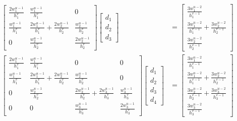 \documentclass{article}
\begin{document}
\begin{align*}
  \begin{bmatrix}
    \frac{2w_1^{u-1}}{h_1^v} & \frac{w_1^{u-1}}{h_1^v} & 0 \\
    \frac{w_1^{u-1}}{h_1^v} & \frac{2w_1^{u-1}}{h_1^v}+\frac{2w_2^{u-1}}{h_2^v} & \frac{w_2^{u-1}}{h_2^v} \\
    0 & \frac{w_2^{u-1}}{h_2^v} & \frac{2w_2^{u-1}}{h_2^v}
  \end{bmatrix}
  \begin{bmatrix}
    d_1 \\ d_2 \\ d_3
  \end{bmatrix}
  &= 
  \begin{bmatrix}
    \frac{3w_1^{u-2}}{h_1^{v-1}} \\
    \frac{3w_1^{u-2}}{h_1^{v-1}}+\frac{3w_2^{u-2}}{h_2^{v-1}} \\
    \frac{3w_2^{u-2}}{h_2^{v-1}}
  \end{bmatrix} \\
  \begin{bmatrix}
    \frac{2w_1^{u-1}}{h_1^v} & \frac{w_1^{u-1}}{h_1^v} & 0 & 0\\
    \frac{w_1^{u-1}}{h_1^v} & \frac{2w_1^{u-1}}{h_1^v}+\frac{2w_2^{u-1}}{h_2^v} & \frac{w_2^{u-1}}{h_2^v} & 0 \\
    0 & \frac{w_2^{u-1}}{h_2^v} & \frac{2w_2^{u-1}}{h_2^v}+\frac{2w_3^{u-1}}{h_3^v} & \frac{w_3^{u-1}}{h_3^v} \\
    0 & 0 & \frac{w_3^{u-1}}{h_3^v} & \frac{2w_3^{u-1}}{h_3^v}
  \end{bmatrix}
  \begin{bmatrix}
    d_1 \\ d_2 \\ d_3 \\ d_4
  \end{bmatrix}
  &= 
  \begin{bmatrix}
    \frac{3w_1^{u-2}}{h_1^{v-1}} \\
    \frac{3w_1^{u-2}}{h_1^{v-1}}+\frac{3w_2^{u-2}}{h_2^{v-1}} \\
    \frac{3w_2^{u-2}}{h_2^{v-1}}+\frac{3w_3^{u-2}}{h_3^{v-1}} \\
    \frac{3w_3^{u-2}}{h_3^{v-1}}
  \end{bmatrix}
\end{align*}
\end{document}
